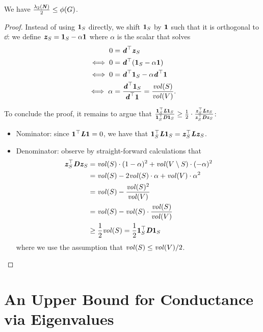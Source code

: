 \begin{theorem}\label{thm:cheegerInequLowerBound}
We have $\frac{\lambda_2(\NN)}{2} \leq \phi(G)$.
\end{theorem}
\begin{proof}
Instead of using $\vecone_S$ directly, we shift $\vecone_S$ by $\vecone$ such that it is orthogonal to $\dd$: we define $\zz_S = \vecone_S - \alpha \vecone$ where $\alpha$ is the scalar that solves
\begin{align*}
       0 &= \dd^\trp \zz_S \\
       \iff 0 &= \dd^\trp(\vecone_S - \alpha \vecone)\\
       \iff 0 &= \dd^\trp \vecone_S - \alpha  \dd^\trp\vecone \\
       \iff \alpha &= \frac{\dd^\trp \vecone_S}{\dd^\trp\vecone} = \frac{\vol(S)}{\vol(V)}.
\end{align*}

To conclude the proof, it remains to argue that $\frac{\vecone_S^\trp \LL \vecone_S}{\vecone_S^\trp\DD\vecone_S} \geq \frac{1}{2} \cdot \frac{\zz_S^\trp \LL \zz_S}{\zz_S^\trp\DD\zz_S}$:
\begin{itemize}
    \item Nominator: since $\vecone^\trp \LL \vecone = 0$, we have that $\vecone_S^\trp \LL \vecone_S = \zz_S^\trp \LL \zz_S$.
    \item Denominator: observe by straight-forward calculations that \begin{align*}
        \zz_S^\trp\DD\zz_S &= \vol(S) \cdot (1-\alpha)^2 + \vol(V \setminus S) \cdot (-\alpha)^2\\
        &= \vol(S) - 2\vol(S) \cdot \alpha + \vol(V) \cdot \alpha^2\\
        & = \vol(S) -   \frac{\vol(S)^2}{\vol(V)} \\
        & = \vol(S) - \vol(S) \cdot  \frac{\vol(S)}{\vol(V)}\\
        & \geq \frac{1}{2}\vol(S) = \frac{1}{2}\vecone_S^\trp\DD\vecone_S
    \end{align*}
    where we use the assumption that $\vol(S) \leq \vol(V)/2$.
\end{itemize}
\end{proof}

\section{An Upper Bound for Conductance via Eigenvalues}

